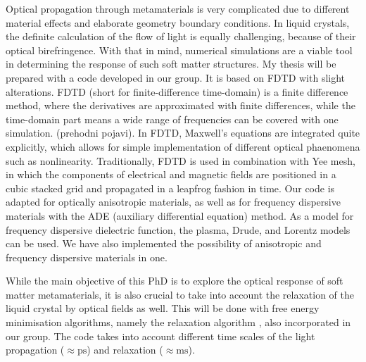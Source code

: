 \documentclass[a4paper,11pt]{article}
\begin{document}
Optical propagation through metamaterials is very complicated due to different material effects and elaborate geometry boundary conditions. 
In liquid crystals, the definite calculation of the flow of light is equally challenging, because of their optical birefringence. 
With that in mind, numerical simulations are a viable tool in determining the response of such soft matter structures. 
My thesis will be prepared with a code developed in our group. 
It is based on FDTD with slight alterations. 
FDTD (short for finite-difference time-domain) is a finite difference method, where the derivatives are approximated with finite differences, while the time-domain part means a wide range of frequencies can be covered with one simulation. (prehodni pojavi). 
In FDTD, Maxwell's equations are integrated quite explicitly, which allows for simple implementation of different optical phaenomena such as nonlinearity. 
Traditionally, FDTD is used in combination with Yee mesh, in which the components of electrical and magnetic fields are positioned in a cubic stacked grid and propagated in a leapfrog fashion in time. 
Our code is adapted for optically anisotropic materials, as well as for frequency dispersive materials with the ADE (auxiliary differential equation) method. 
As a model for frequency dispersive dielectric function, the plasma, Drude, and Lorentz models can be used. 
We have also implemented the possibility of anisotropic and frequency dispersive materials in one. 

While the main objective of this PhD is to explore the optical response of soft matter metamaterials, it is also crucial to take into account the relaxation of the liquid crystal by optical fields as well. 
This will be done with free energy minimisation algorithms, namely the relaxation algorithm \cite{ravnik}, also incorporated in our group. 
The code takes into account different time scales of the light propagation ($\approx \mathrm{ps}$) and relaxation ($\approx \mathrm{ms}$). 

\end{document}
